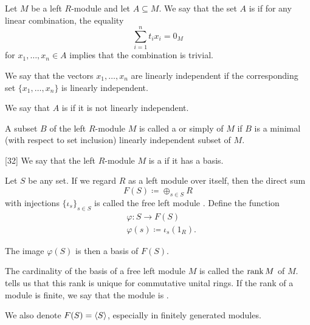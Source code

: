 \begin{definition}\label{def:left_module_linear_dependence}
  Let \( M \) be a left \( R \)-module and let \( A \subseteq M \). We say that the set \( A \) is  if for any linear combination, the equality
  \begin{equation*}
    \sum_{i=1}^n t_i x_i = 0_M
  \end{equation*}
  for \( x_1, \ldots, x_n \in A \) implies that the combination is trivial.

  We say that the vectors \( x_1, \ldots, x_n \) are linearly independent if the corresponding set \( \{ x_1, \ldots, x_n \} \) is linearly independent.

  We say that \( A \) is  if it is not linearly independent.
\end{definition}

\begin{definition}\label{def:left_module_hamel_basis}
  A subset \( B \) of the left \( R \)-module \( M \) is called a  or simply  of \( M \) if \( B \) is a minimal (with respect to set inclusion) linearly independent subset of \( M \).
\end{definition}

\begin{definition}\label{def:free_left_module}[32]\cite[377]{Knapp2016BAlg}
  We say that the left \( R \)-module \( M \) is a  if it has a basis.

  Let \( S \) be any set. If we regard \( R \) as a left module over itself, then the direct sum
  \begin{equation*}
    F(S) \coloneqq \oplus_{s \in S} R
  \end{equation*}
  with injections \( \{ \iota_s \}_{s \in S} \) is called the free left module . Define the function
  \begin{align*}
    &\varphi: S \to F(S) \\
    &\varphi(s) \coloneqq \iota_s(1_R).
  \end{align*}

  The image \( \varphi(S) \) is then a basis of \( F(S) \).

  The cardinality of the basis of a free left module \( M \) is called the  \( \operatorname{rank} M \) of \( M \).  tells us that this rank is unique for commutative unital rings. If the rank of a module is finite, we say that the module is .

  We also denote \( F(S) = \left\langle S \right\rangle \), especially in finitely generated modules.
\end{definition}

